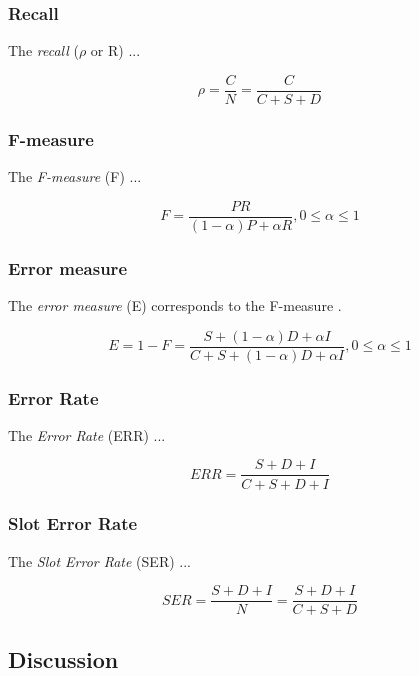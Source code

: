\subsubsection{Recall}
The \textit{recall} (\ensuremath{\rho} or R) ...

\begin{displaymath}
	\rho = \frac{C}{N} = \frac{C}{C+S+D}
\end{displaymath}

\subsubsection{F-measure}
The \textit{F-measure} (F) ...

\begin{displaymath}
	F = \frac{PR}{(1-\alpha)P + {\alpha}R}, 0\le\alpha{\le}1
\end{displaymath}

\subsubsection{Error measure}
The \textit{error measure} (E) corresponds to the F-measure \cite{Feilmayr:2012}.

\begin{displaymath}
	E = 1-F = \frac{S+(1-\alpha)D+{\alpha}I}{C+S+(1-\alpha)D+{\alpha}I}, 0\le\alpha{\le}1
\end{displaymath}

\subsubsection{Error Rate}
The \textit{Error Rate} (ERR) ...

\begin{displaymath}
	ERR = \frac{S+D+I}{C+S+D+I}
\end{displaymath}

\subsubsection{Slot Error Rate}
The \textit{Slot Error Rate} (SER) ... 

\begin{displaymath}
	SER = \frac{S+D+I}{N} = \frac{S+D+I}{C+S+D}
\end{displaymath}

\subsection{Discussion}

